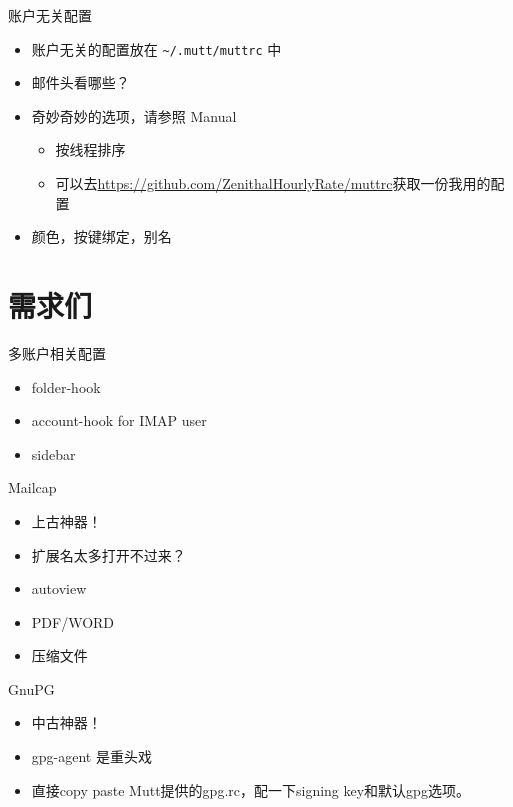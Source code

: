 \documentclass{ctexbeamer}
\newcommand{\T}[1]{\texttt{#1}}
\begin{document}
\begin{frame}{账户无关配置}
  \begin{itemize}
    \item 账户无关的配置放在 \T{\~{}/.mutt/muttrc} 中
    \item 邮件头看哪些？
    \item 奇妙奇妙的选项，请参照 Manual\begin{itemize}
        \item 按线程排序
        \item 可以去\url{https://github.com/ZenithalHourlyRate/muttrc}获取一份我用的配置
    \end{itemize}
    \item 颜色，按键绑定，别名
  \end{itemize}
\end{frame}

\section{需求们}
\begin{frame}{多账户相关配置}
  \begin{itemize}
    \item folder-hook
    \item account-hook for IMAP user
    \item sidebar 
  \end{itemize}
\end{frame}

\begin{frame}{Mailcap}
  \begin{itemize}
    \item 上古神器！
    \item 扩展名太多打开不过来？
    \item autoview
    \item PDF/WORD
    \item 压缩文件
  \end{itemize}
\end{frame}

\begin{frame}{GnuPG}
  \begin{itemize}
    \item 中古神器！
    \item gpg-agent 是重头戏
    \item 直接copy paste Mutt提供的gpg.rc，配一下signing key和默认gpg选项。
  \end{itemize}
\end{frame}
\end{document}
